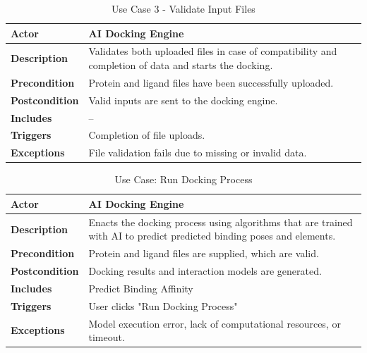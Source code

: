 \documentclass[12pt,a4]{report}
\begin{document}
\begin{itemize}
\begin{longtable}{|p{4cm}|p{9.8cm}|}
\caption{Use Case 3 - Validate Input Files} \\ \hline
\textbf{Actor} & AI Docking Engine \\ \hline
\textbf{Description} & Validates both uploaded files in case of compatibility and completion of data and starts the docking. \\ \hline
\textbf{Precondition} & Protein and ligand files have been successfully uploaded. \\ \hline
\textbf{Postcondition} & Valid inputs are sent to the docking engine. \\ \hline
\textbf{Includes} & -- \\ \hline
\textbf{Triggers} & Completion of file uploads. \\ \hline
\textbf{Exceptions} & File validation fails due to missing or invalid data. \\ \hline
\end{longtable}

\begin{longtable}{|p{4cm}|p{9.8cm}|}
\caption{Use Case: Run Docking Process} \\ \hline
\textbf{Actor} & AI Docking Engine \\ \hline
\textbf{Description} & Enacts the docking process using algorithms that are trained with AI to predict predicted binding poses and elements. \\ \hline
\textbf{Precondition} & Protein and ligand files are supplied, which are valid. \\ \hline
\textbf{Postcondition} & Docking results and interaction models are generated. \\ \hline
\textbf{Includes} & Predict Binding Affinity \\ \hline
\textbf{Triggers} & User clicks "Run Docking Process" \\ \hline
\textbf{Exceptions} & Model execution error, lack of computational resources, or timeout. \\ \hline
\end{longtable}


\end{itemize}
\end{document}
